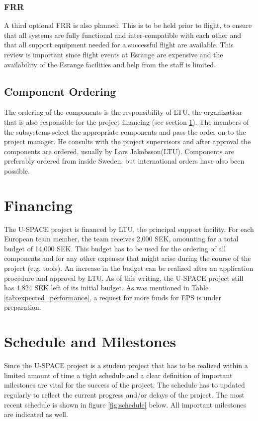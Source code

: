 \subsubsection*{\acl{FRR}}
A third optional \ac{FRR} is also planned. This is to be held prior to flight, to ensure that all systems are fully functional and inter-compatible with each other and that all support equipment needed for a successful flight are available. This review is important since flight events at Esrange are expensive and the availability of the Esrange facilities and help from the staff is limited.
%
%
\subsection{Component Ordering}
%
The ordering of the components is the responsibility of \ac{LTU}, the organization that is also responsible for the project financing (see section \ref{sec:financing}). The members of the subsystems select the appropriate components and pass the order on to the project manager. He consults with the project supervisors and after approval the components are ordered, usually by Lars Jakobsson(LTU). Components are preferably ordered from inside Sweden, but international orders have also been possible.

\section{Financing}
\label{sec:financing}

The \ac{U-SPACE} project is financed by \ac{LTU}, the principal support facility. For each European team member, the team receives 2,000 SEK, amounting for a total budget of 14,000 SEK. This budget has to be used for the ordering of all components and for any other expenses that might arise during the course of the project (e.g. tools). An increase in the budget can be realized after an application procedure and approval by \ac{LTU}. As of this writing, the \ac{U-SPACE} project still has 4,824 SEK left of its initial budget. As was mentioned in Table \ref{tab:expected_performance}, a request for more funds for \ac{EPS} is under preparation.
%
%
\section{Schedule and Milestones}

Since the \ac{U-SPACE} project is a student project that has to be realized within a limited amount of time a tight schedule and a clear definition of important milestones are vital for the success of the project. The schedule has to updated regularly to reflect the current progress and/or delays of the project. The most recent schedule is shown in figure \ref{fig:schedule} below. All important milestones are indicated as well.

